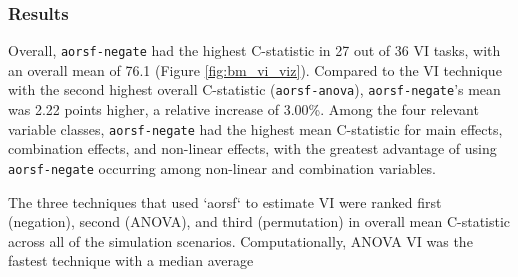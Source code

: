 \documentclass[twoside,11pt]{article}\usepackage[]{graphicx}\usepackage[]{xcolor}
\begin{document}
\subsubsection{Results} \label{sec:results_vi}



Overall, \texttt{aorsf-negate} had the highest C-statistic in 27 out of 36 VI tasks, with an overall mean of 76.1 (Figure \ref{fig:bm_vi_viz}). Compared to the VI technique with the second highest overall C-statistic (\texttt{aorsf-anova}), \texttt{aorsf-negate}'s mean was 2.22 points higher, a relative increase of 3.00\%. Among the four relevant variable classes, \texttt{aorsf-negate} had the highest mean C-statistic for main effects, combination effects, and non-linear effects, with the greatest advantage of using \texttt{aorsf-negate} occurring among non-linear and combination variables.

The three techniques that used `aorsf` to estimate VI were ranked first (negation), second (ANOVA), and third (permutation) in overall mean C-statistic across all of the simulation scenarios. Computationally, ANOVA VI was the fastest technique with a median average
\end{document}
